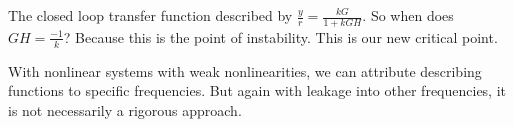 \documentclass[11pt]{article}
\begin{document}
The closed loop transfer function described by $\frac{y}{r} = \frac{kG}{1+kGH}$. So when does $GH = \frac{-1}{k}$? Because this is the point of instability. This is our new critical point.

With nonlinear systems with weak nonlinearities, we can attribute describing functions to specific frequencies. But again with leakage into other frequencies, it is not necessarily a rigorous approach.


























\clearpage
% 
\end{document}
